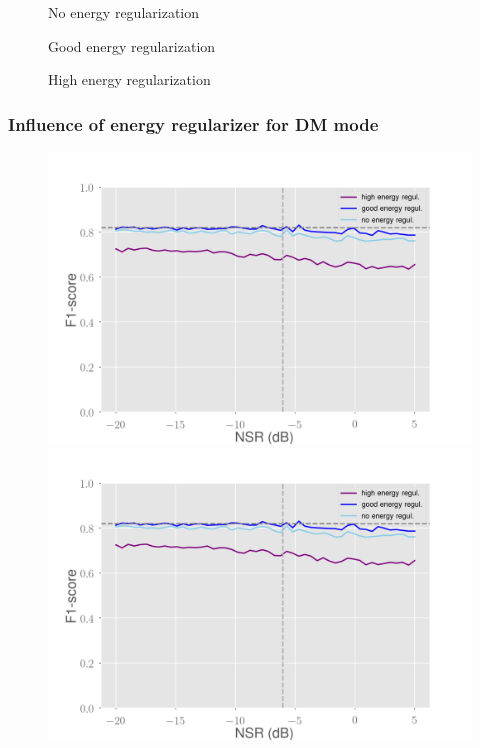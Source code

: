 \documentclass[10pt]{beamer}
\begin{document}
\begin{frame}
\begin{multicols}{2}
\begin{figure}
\begin{overprint}
\end{overprint}
\caption{No energy regularization}
\vspace*{-0.9cm}\caption{Good energy regularization}
\vspace*{-0.9cm}\caption{High energy regularization}
\end{figure}
\end{multicols}
\end{frame}

\begin{frame}
\frametitle{Influence of energy regularizer for DM mode}
\begin{multicols}{2}
\begin{figure}
\centering
\begin{overprint}
    \includegraphics[scale=0.2]{figs/energy-dm-noisy}
    \includegraphics[scale=0.2]{figs/energy-dm-noisy}

\end{overprint}
\end{figure}
\end{multicols}
\end{frame}
\end{document}
